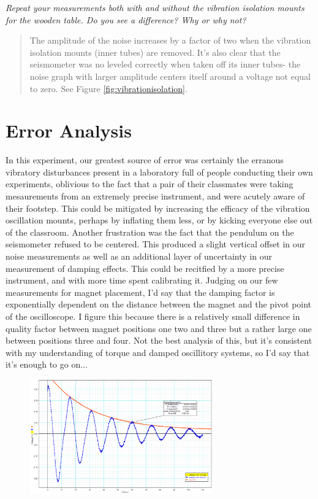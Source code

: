 \documentclass{amsart}
\begin{document}
\textit{Repeat your measurements both with and without the vibration isolation mounts for the wooden table. Do you see a difference? Why or why not?}
\begin{quote}
    The amplitude of the noise increases by a factor of two when the vibration isolation mounts (inner tubes) are removed. It's also clear that the seismometer was no leveled correctly when taken off its inner tubes\-- the noise graph with larger amplitude centers itself around a voltage not equal to zero. See Figure \ref{fig:vibrationisolation}.
\end{quote}


\section{Error Analysis}
In this experiment, our greatest source of error was certainly the erranous vibratory disturbances present in a laboratory full of people conducting their own experiments, oblivious to the fact that a pair of their classmates were taking mesaurements from an extremely precise instrument, and were acutely aware of their footstep. This could be mitigated by increasing the efficacy of the vibration oscillation mounts, perhaps by inflating them less, or by kicking everyone else out of the classroom. Another frustration was the fact that the pendulum on the seismometer refused to be centered. This produced a slight vertical offset in our noise measurements as well as an additional layer of uncertainty in our measurement of damping effects. This could be recitfied by a more precise instrument, and with more time spent calibrating it. Judging on our few measurements for magnet placement, I'd say that the damping factor is exponentially dependent on the distance between the magnet and the pivot point of the oscilloscope. I figure this because there is a relatively small difference in quality factor between magnet positions one two and three but a rather large one between positions three and four. Not the best analysis of this, but it's consistent with my understanding of torque and damped oscillitory systems, so I'd say that it's enough to go on...
\vspace{0.2cm}
\begin{figure}[H]
    \includegraphics[width=0.7\textwidth]{dampedwithfit.png}
\end{figure}

\newpage
{}

\end{document}
